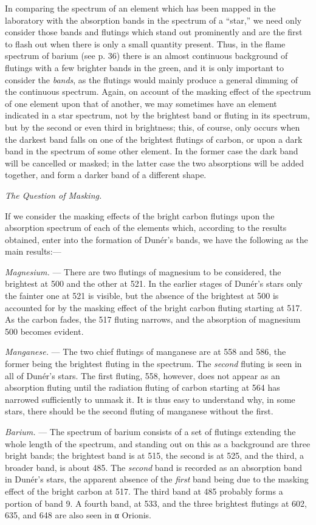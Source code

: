 \documentclass[a4paper, 12pt, oneside, polutonikogreek, english]{article}
\begin{document}
In comparing the spectrum of an element which has been mapped in the laboratory with the absorption bands in the spectrum of a ``star,'' we need only consider those bands and flutings which stand out prominently and are the first to flash out when there is only a small quantity present. Thus, in the flame spectrum of barium (see p. 36) there is an almost continuous background of flutings with a few brighter bands in the green, and it is only important to consider the \emph{bands}, as the flutings would mainly produce a general dimming of the continuous spectrum. Again, on account of the masking effect of the spectrum of one element upon that of another, we may sometimes have an element indicated in a star spectrum, not by the brightest band or fluting in its spectrum, but by the second or even third in brightness; this, of course, only occurs when the darkest band falls on one of the brightest flutings of carbon, or upon a dark band in the spectrum of some other element. In the former case the dark band will be cancelled or masked; in the latter case the two absorptions will be added together, and form a darker band of a different shape.

\emph{The Question of Masking.}

If we consider the masking effects of the bright carbon flutings upon the absorption spectrum of each of the elements which, according to the results obtained, enter into the formation of Dunér's bands, we have the following as the main results:---

\emph{Magnesium.} --- There are two flutings of magnesium to be considered, the brightest at 500 and the other at 521. In the earlier stages of Dunér's stars only the fainter one at 521 is visible, but the absence of the brightest at 500 is accounted for by the masking effect of the bright carbon fluting starting at 517. As the carbon fades, the 517 fluting narrows, and the absorption of magnesium 500 becomes evident.

\emph{Manganese.} --- The two chief flutings of manganese are at 558 and 586, the former being the brightest fluting in the spectrum. The \emph{second} fluting is seen in all of Dunér's stars. The first fluting, 558, however, does not appear as an absorption fluting until the radiation fluting of carbon starting at 564 has narrowed sufficiently to unmask it. It is thus easy to understand why, in some stars, there should be the second fluting of manganese without the first.

\emph{Barium.} --- The spectrum of barium consists of a set of flutings extending the whole length of the spectrum, and standing out on this as a background are three bright bands; the brightest band is at 515, the second is at 525, and the third, a broader band, is about 485. The \emph{second} band is recorded as an absorption band in Dunér's stars, the apparent absence of the \emph{first} band being due to the masking effect of the bright carbon at 517. The third band at 485 probably forms a portion of band 9. A fourth band, at 533, and the three brightest flutings at 602, 635, and 648 are also seen in α Orionis.
\end{document}
